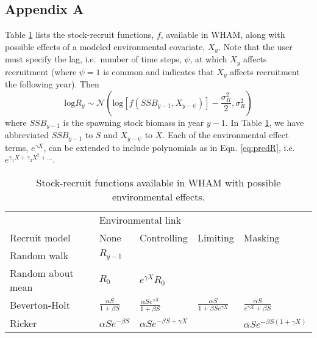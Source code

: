 \documentclass[]{article}
\begin{document}
\pagebreak

\hypertarget{appendix-a}{%
\subsection*{Appendix A}\label{appendix-a}}

Table \ref{tab:SRmodels} lists the stock-recruit functions, \(f\),
available in WHAM, along with possible effects of a modeled
environmental covariate, \(X_y\). Note that the user must specify the
lag, i.e.~number of time steps, \(\psi\), at which \(X_y\) affects
recruitment (where \(\psi=1\) is common and indicates that \(X_y\)
affects recruitment the following year). Then
\[\text{log}R_y \sim \mathcal{N} \left( \text{log} \left[ f(SSB_{y-1}, X_{y-\psi}) \right] - \frac{\sigma^2_R}{2}, \sigma^2_R \right)\]
where \(SSB_{y-1}\) is the spawning stock biomass in year \(y-1\). In
Table \ref{tab:SRmodels}, we have abbreviated \(SSB_{y-1}\) to \(S\) and
\(X_{y-\psi}\) to \(X\). Each of the environmental effect terms,
\(e^{\gamma X}\), can be extended to include polynomials as in Eqn.
\ref{eq:predR}, i.e. \(e^{\gamma_1 X + \gamma_2 X^2 + \dots}\).

\bigskip

\setcounter{table}{0}
\renewcommand{\thetable}{A\arabic{table}}
\renewcommand{\arraystretch}{1.5}

\begin{table}[!h]

\caption{\label{tab:SRmodels}Stock-recruit functions available in WHAM with possible environmental effects.}
\centering
\begin{tabular}[t]{lllll}
\toprule
\multicolumn{1}{l}{ } & \multicolumn{4}{l}{Environmental link} \\
\cmidrule(l{3pt}r{3pt}){2-5}
Recruit model & None & Controlling & Limiting & Masking\\
\midrule
Random walk & $R_{y-1}$ &  &  & \\
Random about mean & $R_0$ & $e^{\gamma X} R_0$ &  & \\
Beverton-Holt & $\frac{\alpha S}{1 + \beta S}$ & $\frac{\alpha S e^{\gamma X}}{1 + \beta S}$ & $\frac{\alpha S}{1 + \beta S e^{\gamma X}}$ & $\frac{\alpha S}{e^{\gamma X} + \beta S}$\\
Ricker & $\alpha S e^{-\beta S}$ & $\alpha S e^{-\beta S + \gamma X}$ &  & $\alpha S e^{-\beta S (1 + \gamma X)}$\\
\bottomrule
\end{tabular}
\end{table}
\end{document}
